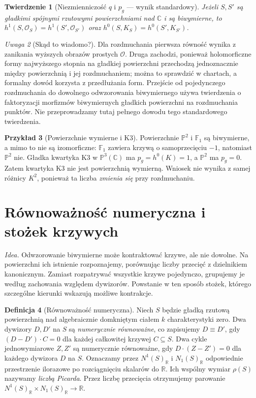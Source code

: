 \documentclass[11pt,a4paper,openany]{report}
\numberwithin{equation}{section}
\theoremstyle{plain}
\newtheorem{twierdzenie}{Twierdzenie}[section]
\theoremstyle{definition}
\newtheorem{definicja}[twierdzenie]{Definicja}
\newtheorem{przyklad}[twierdzenie]{Przykład}
\theoremstyle{remark}
\newtheorem{uwaga}[twierdzenie]{Uwaga}
\newcommand{\R}{\mathbb R}
\newcommand{\C}{\mathbb C}
\newcommand{\PP}{\mathbb P}
\begin{document}
\begin{twierdzenie}[Niezmienniczość $q$ i $p_g$ — wynik standardowy]
\label{tw:ga8-q-pg}
Jeżeli $S,S'$ są gładkimi spójnymi rzutowymi
powierzchniami nad $\C$ i są biwymierne, to
$h^1(S,\mathcal O_S)=h^1(S',\mathcal O_{S'})$ oraz
$h^0(S,K_S)=h^0(S',K_{S'})$.
\end{twierdzenie}
\begin{uwaga}[Skąd to wiadomo?]
Dla rozdmuchania pierwsza równość wynika z zanikania
wyższych obrazów prostych $\mathcal O$.
Druga zachodzi, ponieważ holomorficzne formy
najwyższego stopnia na gładkiej powierzchni
przechodzą jednoznacznie między powierzchnią i jej
rozdmuchaniem; można to sprawdzić w chartach, a
formalny dowód korzysta z przedłużania form.
Przejście od pojedynczego rozdmuchania do dowolnego
odwzorowania biwymiernego używa twierdzenia o
faktoryzacji morfizmów biwymiernych gładkich powierzchni
na rozdmuchania punktów. Nie przeprowadzamy tutaj
pełnego dowodu tego standardowego twierdzenia.
\end{uwaga}

\begin{przyklad}[Powierzchnie wymierne i K3]
Powierzchnie $\PP^2$ i $\mathbb F_1$ są biwymierne,
a mimo to nie są izomorficzne: $\mathbb F_1$ zawiera
krzywą o samoprzecięciu $-1$, natomiast $\PP^2$ nie.
Gładka kwartyka K3 w $\PP^3(\C)$ ma
$p_g=h^0(K)=1$, a $\PP^2$ ma $p_g=0$.
Zatem kwartyka K3 nie jest powierzchnią wymierną.
Wniosek nie wynika z samej różnicy $K^2$, ponieważ
ta liczba \emph{zmienia się} przy rozdmuchaniu.
\end{przyklad}

\section{Równoważność numeryczna i stożek krzywych}
\label{sec:ga8-ne-cone}

\emph{Idea.} Odwzorowanie biwymierne może kontraktować krzywe,
ale nie dowolne. Na powierzchni ich istnienie rozpoznajemy,
porównując liczby przecięć z dzielnikiem kanonicznym.
Zamiast rozpatrywać wszystkie krzywe pojedynczo, grupujemy je
według zachowania względem dywizorów. Powstanie w ten sposób
stożek, którego szczególne kierunki wskazują możliwe kontrakcje.

\begin{definicja}[Równoważność numeryczna]
\label{def:ga8-numerical}
Niech $S$ będzie gładką rzutową powierzchnią nad algebraicznie
domkniętym ciałem $k$ charakterystyki zero. Dwa dywizory
$D,D'$ na $S$ są \emph{numerycznie równoważne}, co zapisujemy
$D\equiv D'$, gdy $(D-D')\cdot C=0$ dla każdej całkowitej
krzywej $C\subseteq S$. Dwa cykle jednowymiarowe $Z,Z'$
są numerycznie równoważne, gdy $D\cdot(Z-Z')=0$ dla
każdego dywizora $D$ na $S$. Oznaczamy przez
$N^1(S)_{\R}$ i $N_1(S)_{\R}$ odpowiednie przestrzenie
ilorazowe po rozciągnięciu skalarów do $\R$.
Ich wspólny wymiar $\rho(S)$ nazywamy \emph{liczbą Picarda}.
Przez liczbę przecięcia otrzymujemy parowanie
$N^1(S)_{\R}\times N_1(S)_{\R}\to\R$.
\end{definicja}
\end{document}
